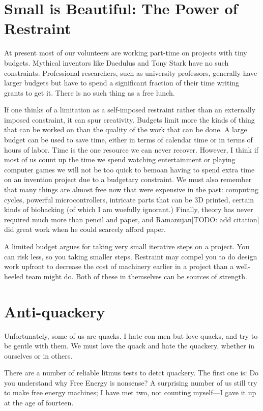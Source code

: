 \documentclass[
	fontsize=10pt, %
	twoside=false, %
	secnumdepth=1, %
]{kaobook}
\begin{document}
\section{Small is Beautiful: The Power of Restraint}

At present most of our volunteers are working part-time on projects
with tiny budgets.
Mythical inventors like Daedulus and Tony Stark have no such constraints.
Professional researchers, such as university professors, generally have larger budgets
but have to spend a significant fraction of their time writing grants to get it.
There is no such thing as a free lunch.

If one thinks of a limitation as a self-imposed restraint rather than
an externally imposed constraint, it can spur creativity.  Budgets
limit more the kinds of thing that can be worked on than the quality
of the work that can be done.  A large budget can be used to save
time, either in terms of calendar time or in terms of hours of labor.
Time is the one resource we can never recover.  However, I think if
most of us count up the time we spend watching entertainment or
playing computer games we will not be too quick to bemoan having to
spend extra time on an invention project due to a budgetary
constraint.  We must also remember that many things are almost free
now that were expensive in the past: computing cycles, powerful
microcontrollers, intricate parts that can be 3D printed, certain
kinds of biohacking (of which I am woefully ignorant.)  Finally,
theory has never required much more than pencil and paper, and
Ramanujan[TODO: add citation] did great work when he could scarcely
afford paper.

A limited budget argues for taking very small iterative steps on a
project.  You can risk less, so you taking smaller steps.
Restraint may compel you to do design work upfront to decrease the cost
of machinery earlier in a project than a well-heeled team might do.
Both of these in themselves can be sources of strength.

\section{Anti-quackery}

Unfortunately, some of us are quacks.
I hate con-men but love quacks, and try to be gentle with them.
We must love the quack and hate the quackery, whether in ourselves
or in others.

There are a number of reliable litmus tests to detct quackery.
The first one is: Do you understand why Free Energy is nonsense?
A surprising number of us still try to make free energy machines;
I have met two, not counting myself---I gave it up at the age of fourteen.
\end{document}
